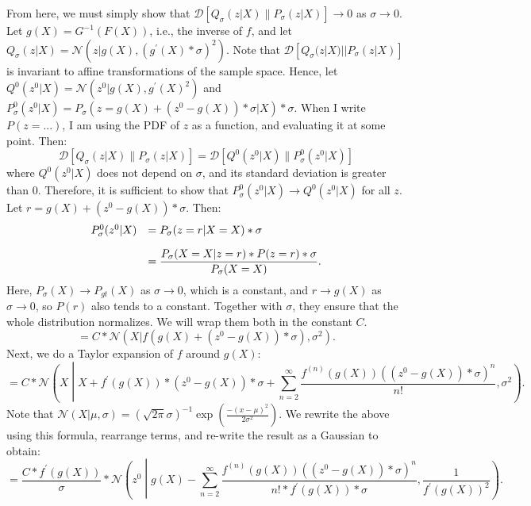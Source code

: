 \documentclass[a4paper, 11pt]{article} %
\begin{document}
From here, we must simply show that $\mathcal{D}[Q_\sigma(z|X)\|P_\sigma(z|X)]\rightarrow 0$ as $\sigma \rightarrow 0$.
Let $g(X)=G^{-1}(F(X))$, i.e., the inverse of $f$, and let $Q_\sigma(z|X)=\mathcal{N}(z|g(X),(g^{\prime}(X)*\sigma)^2)$.
Note that $\mathcal{D}[Q_\sigma(z|X)||P_\sigma(z|X)]$ is invariant to affine transformations of the sample space.
Hence, let $Q^0(z^0|X)=\mathcal{N}(z^0|g(X),g^{\prime}(X)^2)$ and $P^0_\sigma(z^0|X)=P_\sigma(z=g(X)+(z^0-g(X))*\sigma|X)*\sigma$.
When I write $P(z=...)$, I am using the PDF of $z$ as a function, and evaluating it at some point.
Then:
\begin{equation}
 \mathcal{D}[Q_\sigma(z|X)\|P_\sigma(z|X)]=\mathcal{D}[Q^0(z^0|X)\|P^0_\sigma(z^0|X)]
\end{equation}
where $Q^0(z^0|X)$ does not depend on $\sigma$, and its standard deviation is greater than $0$.
Therefore, it is sufficient to show that $P^0_\sigma(z^0|X)\rightarrow Q^0(z^0|X)$ for all $z$.
Let $r=g(X)+(z^0-g(X))*\sigma$.
Then:
\begin{equation}
\begin{array}{rl}
  P^{0}_\sigma(z^0|X) & =P_\sigma(z=r|X=X)*\sigma \vspace{1em}\\
  &=\dfrac{P_\sigma(X=X|z=r)*P(z=r)*\sigma}{P_\sigma(X=X)}.
\end{array}
\end{equation}
Here, $P_\sigma(X) \rightarrow P_{gt}(X)$ as $\sigma \rightarrow 0$, which is a constant, and $r\rightarrow g(X)$ as $\sigma \rightarrow 0$, so $P(r)$ also tends to a constant.
Together with $\sigma$, they ensure that the whole distribution normalizes.
We will wrap them both in the constant $C$.
\begin{equation}
  =C*\mathcal{N}(X|f(g(X)+(z^0-g(X))*\sigma),\sigma^{2}).
\end{equation}
Next, we do a Taylor expansion of $f$ around $g(X)$:
\begin{equation}
  =C*\mathcal{N}\left(X\middle| X+f^{\prime}(g(X))*(z^0-g(X))*\sigma+\sum_{n=2}^{\infty}\frac{f^{(n)}(g(X))((z^0-g(X))*\sigma)^n}{n!},\sigma^{2}\right).
\end{equation}
Note that $\mathcal{N}(X|\mu,\sigma)=(\sqrt{2\pi}\sigma)^{-1}\exp\left(\frac{-(x-\mu)^2}{2\sigma^2}\right)$.  We rewrite the above using this formula, rearrange terms, and re-write the result as a Gaussian to obtain:
\begin{equation}
  =\frac{C*f^{\prime}(g(X))}{\sigma}*\mathcal{N}\left(z^0\middle|g(X)-\sum_{n=2}^{\infty}\frac{f^{(n)}(g(X))((z^0-g(X))*\sigma)^n}{n!*f^{\prime}(g(X))*\sigma},\frac{1}{f^{\prime}(g(X))^2}\right).
  \label{eq:taylor}
\end{equation}
\end{document}
